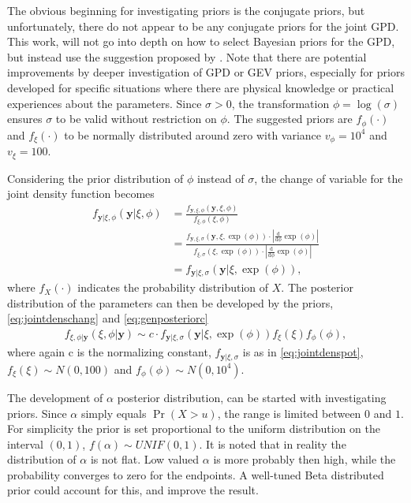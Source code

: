 The obvious beginning for investigating priors is the conjugate priors, but unfortunately, there do not appear to be any conjugate priors for the joint GPD. This work, will not go into depth on how to select Bayesian priors for the GPD, but instead use the suggestion proposed by \cite[p.~174]{stuart}. Note that there are potential improvements by deeper investigation of GPD or GEV priors, especially for priors developed for specific situations where there are physical knowledge or practical experiences about the parameters. Since $\sigma>0$, the transformation $\phi=\log(\sigma)$ ensures $\sigma$ to be valid without restriction on $\phi$. The suggested priors are $f_{\phi}(\cdot)$ and $f_{\xi}(\cdot)$ to be normally distributed around zero with variance $v_{\phi}=10^4$ and $v_{\xi}=100$. 

Considering the prior distribution of $\phi$ instead of $\sigma$, the change of variable for the joint density function becomes 
\begin{align}
f_{\boldsymbol{y}|\xi,\phi}(\boldsymbol{y}|\xi,\phi)&=\frac{f_{\boldsymbol{y},\xi,\phi}(\boldsymbol{y},\xi,\phi)}{f_{\xi,\phi}(\xi,\phi)}\nonumber\\
&=\frac{f_{\boldsymbol{y},\xi,\sigma}\left(\boldsymbol{y},\xi,\exp(\phi)\right)\cdot \left|\frac{\mathrm d}{\mathrm d \phi} \exp(\phi)\right|}{f_{\xi,\sigma}\left(\xi,\exp(\phi)\right)\cdot \left|\frac{\mathrm d}{\mathrm d \phi} \exp(\phi)\right|}\nonumber\\
&=f_{\boldsymbol{y}|\xi,\sigma}\left(\boldsymbol{y}|\xi,\exp(\phi)\right), \label{eq:jointdenschang}
\end{align}
where $f_{X}(\cdot)$ indicates the probability distribution of $X$.
The posterior distribution of the parameters can then be developed by the priors, \eqref{eq:jointdenschang} and \eqref{eq:genposteriorc}
\begin{align}
f_{\xi,\phi|\boldsymbol{y}}(\xi,\phi|\boldsymbol{y})\sim c \cdot f_{\boldsymbol{y}|\xi,\sigma}\left(\boldsymbol{y}|\xi,\exp(\phi)\right)f_{\xi}(\xi)f_{\phi}(\phi), \label{eq:potpost}
\end{align}
where again c is the normalizing constant, $f_{\boldsymbol{y}|\xi,\sigma}$ is as in \eqref{eq:jointdenspot}, $f_{\xi}(\xi)\sim N(0,100)$ and $f_{\phi}(\phi) \sim N(0,10^4)$.

The development of $\alpha$ posterior distribution, can be started with investigating priors. Since $\alpha$ simply equals $\Pr(X>u)$, the range is limited between $0$ and $1$. For simplicity the prior is set proportional to the uniform distribution on the interval $(0,1)$, $f(\alpha) \sim UNIF(0,1)$. It is noted that in reality the distribution of $\alpha$ is not flat. Low valued $\alpha$ is more probably then high, while the probability converges to zero for the endpoints. A well-tuned Beta distributed prior could account for this, and improve the result.

